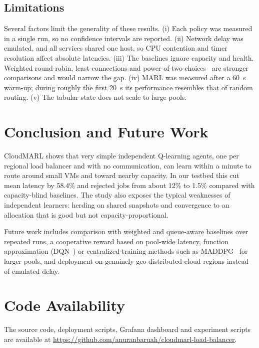 \documentclass[conference]{IEEEtran}
\begin{document}
\subsection{Limitations}
Several factors limit the generality of these results. (i) Each policy was measured in a single run, so no confidence intervals are reported. (ii) Network delay was emulated, and all services shared one host, so CPU contention and timer resolution affect absolute latencies. (iii) The baselines ignore capacity and health. Weighted round-robin, least-connections and power-of-two-choices~\cite{mitzenmacher2001} are stronger comparisons and would narrow the gap. (iv) MARL was measured after a 60~s warm-up; during roughly the first 20~s its performance resembles that of random routing. (v) The tabular state does not scale to large pools.

\section{Conclusion and Future Work}
CloudMARL shows that very simple independent Q-learning agents, one per regional load balancer and with no communication, can learn within a minute to route around small VMs and toward nearby capacity. In our testbed this cut mean latency by 58.4\% and rejected jobs from about 12\% to 1.5\% compared with capacity-blind baselines. The study also exposes the typical weaknesses of independent learners: herding on shared snapshots and convergence to an allocation that is good but not capacity-proportional.

Future work includes comparison with weighted and queue-aware baselines over repeated runs, a cooperative reward based on pool-wide latency, function approximation (DQN~\cite{mnih2015dqn}) or centralized-training methods such as MADDPG~\cite{lowe2017maddpg} for larger pools, and deployment on genuinely geo-distributed cloud regions instead of emulated delay.

\section*{Code Availability}
The source code, deployment scripts, Grafana dashboard and experiment scripts are available at \url{https://github.com/anuranbaruah/cloudmarl-load-balancer}.
\end{document}
